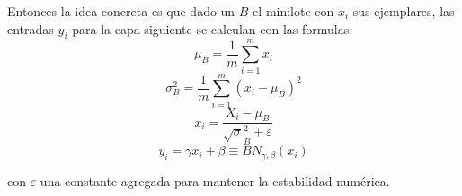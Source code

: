 Entonces la idea concreta es que dado un $B$ el minilote con $x_i$ sus ejemplares, las entradas $y_i$ para la capa siguiente se
calculan con las formulas:
  \begin{equation}
   \mu_{B} = \dfrac{1}{m}\sum_{i=1}^{m}x_{i} 
  \end{equation}
  \begin{equation}
   \sigma_{B}^{2} = \dfrac{1}{m}\sum_{i=1}^{m}(x_{i}-\mu_{B})^2 
  \end{equation}
  \begin{equation}
   x_{i} = \dfrac{X_{i}-\mu_{B}}{ \surd \sigma_{B}^{2} + \varepsilon}
  \label{eq:tres}
  \end{equation}
  \begin{equation}
   y_{i} = \gamma x_{i}+\beta \equiv BN_{\gamma,\beta}(x_{i})
  \label{eq:tres}
  \end{equation}

con $\varepsilon$ una constante agregada para mantener la estabilidad numérica.
